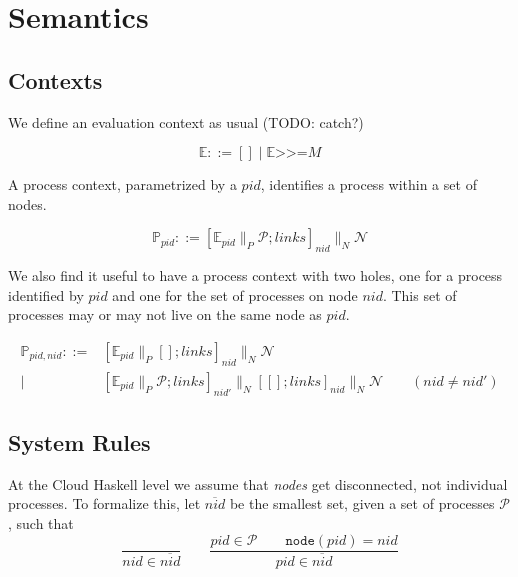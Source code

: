 \documentclass{article}
\newcommand{\sBind}[2]{{#1} \mathrel{\texttt{>}\!\!\texttt{>}\!\texttt{=}} {#2}}
\newcommand{\sPar}{\mathrel{{\parallel}_P}}
\newcommand{\sParN}{\mathrel{{\parallel}_N}}
\newcommand{\sProc}[2]{{#1}_{#2}}
\newcommand{\sPid}{\ensuremath{\mathit{pid}}}
\newcommand{\sNid}{\ensuremath{\mathit{nid}}}
\newcommand{\sLinks}{\ensuremath{\mathit{links}}}
\newcommand{\sNode}[3]{\left[{#1} ; {#2}\right]_{#3}}
\newcommand{\sNodes}{\mathcal{N}}
\newcommand{\sProcesses}{\mathcal{P}}
\newcommand{\sCtxt}[1]{\mathbb{#1}}
\newcommand{\OR}{\mathrel{|}}
\begin{document}
\section{Semantics}

\subsection{Contexts}

We define an evaluation context as usual (TODO: catch?)

\begin{equation*}
\sCtxt{E} ::= [] \OR \sBind{\sCtxt{E}}{M}
\end{equation*}

A process context, parametrized by a \sPid, identifies a process within a set
of nodes. 

\begin{equation*}
\sCtxt{P}_\sPid ::= \sNode{\sProc{\sCtxt{E}}{pid} \sPar \sProcesses}{\sLinks}{\sNid} \sParN \sNodes 
\end{equation*}

We also find it useful to have a process context with two holes, one for a
process identified by \sPid{} and one for the set of processes on node \sNid.
This set of processes may or may not live on the same node as \sPid. 

\begin{equation*}
\begin{array}{rl}
\sCtxt{P}_{\sPid,\sNid} ::= & 
  \sNode{\sProc{\sCtxt{E}}{pid} \sPar []}{\sLinks}{\sNid} \sParN \sNodes \\[1em]
\OR & 
  \sNode{\sProc{\sCtxt{E}}{pid} \sPar \sProcesses}{\sLinks}{\sNid'} \sParN \sNode{[]}{\sLinks}{\sNid} \sParN \sNodes 
    \qquad
  (\sNid \neq \sNid')
\end{array}
\end{equation*}

\subsection{System Rules}

At the Cloud Haskell level we assume that \emph{nodes} get disconnected, not
individual processes. To formalize this, let $\overline{\sNid}$ be the smallest
set, given a set of processes $\sProcesses$, such that
%
\begin{equation*}
\frac{
}{
\sNid \in \overline{\sNid}
} 
%
\qquad
%
\frac{
\sPid \in \sProcesses \qquad
\mathtt{node}(\sPid) = \sNid
}{
\sPid \in \overline{\sNid}
}
\end{equation*}
\end{document}
